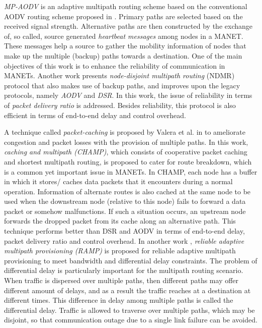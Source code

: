 \documentclass[10pt]{IEEEtran}
\begin{document}
 \textit{MP-AODV} is an adaptive multipath routing scheme based on the conventional AODV routing scheme proposed in \cite{sambasivam2004dynamically}. Primary paths are selected based on the received signal strength. Alternative paths are then constructed by the exchange of, so called, source generated \textit{heartbeat messages} among nodes in a MANET. These messages help a source to gather the mobility information of nodes that make up the multiple (backup) paths towards a destination. One of the main objectives of this work is to enhance the reliability of communication in MANETs. Another work \cite{li2004demand} presents \textit{node-disjoint multipath routing} (NDMR) protocol that also makes use of backup paths, and improves upon the legacy protocols, namely \textit{AODV} and \textit{DSR}. In this work, the issue of reliability in terms of \textit{packet delivery ratio} is addressed. Besides reliability, this protocol is also efficient in terms of end-to-end delay and control overhead.

A technique called \textit{packet-caching} is proposed by Valera et al. in \cite{valera2003cooperative} to ameliorate congestion and packet losses with the provision of multiple paths. In this work, \textit{caching and multipath (CHAMP)}, which consists of cooperative packet caching and shortest multipath routing, is proposed to cater for route breakdown, which is a common yet important issue in MANETs. In CHAMP, each node has a buffer in which it stores/ caches data packets that it encounters during a normal operation. Information of alternate routes is also cached at the same node to be used when the downstream node (relative to this node) fails to forward a data packet or somehow malfunctions. If such a situation occurs, an upstream node forwards the dropped packet from its cache along an alternative path. This technique performs better than DSR and AODV in terms of end-to-end delay, packet delivery ratio and control overhead. In another work \cite{zhang2010reliable}, \textit{reliable adaptive multipath provisioning (RAMP)} is proposed for reliable adaptive multipath provisioning to meet bandwidth and differential delay constraints. The problem of differential delay is particularly important for the multipath routing scenario. When traffic is dispersed over multiple paths, then different paths may offer different amount of delays, and as a result the traffic reaches at a destination at different times. This difference in delay among multiple paths is called the differential delay. Traffic is allowed to traverse over multiple paths, which may be disjoint, so that communication outage due to a single link failure can be avoided.
\end{document}
